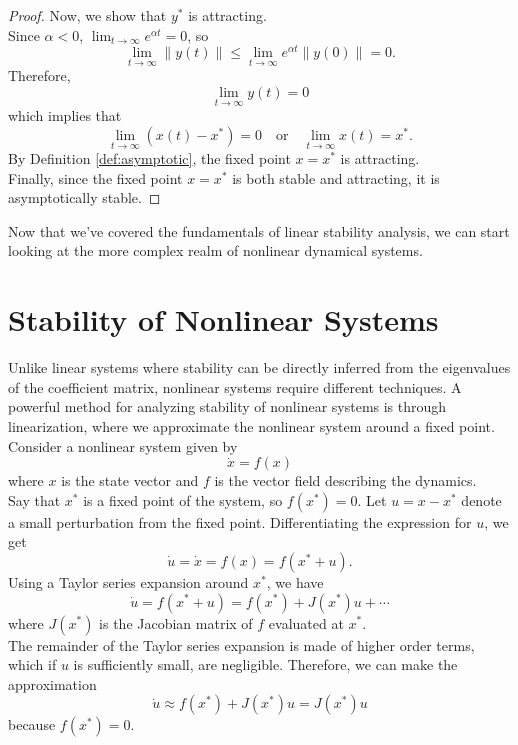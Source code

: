 \documentclass[12pt]{article}
\newcommand{\dx}{\dot{x}}
\newcommand{\du}{\dot{u}}
\begin{document}
\begin{proof}
Now, we show that $y^*$ is attracting. \\

Since $\alpha < 0$, $\lim_{t \to \infty} e^{\alpha t} = 0$, so
$$\lim_{t \to \infty} \|y(t)\| \le \lim_{t \to \infty} e^{\alpha t}\|y(0)\| = 0.$$
Therefore,
$$\lim_{t \to \infty} y(t) = 0$$
which implies that
$$\lim_{t \to \infty} (x(t) - x^*) = 0 \quad \text{or} \quad \lim_{t \to \infty} x(t) = x^*.$$
By Definition \ref{def:asymptotic}, the fixed point $x = x^*$ is attracting. \\

Finally, since the fixed point $x = x^*$ is both stable and attracting, it is asymptotically stable.
\end{proof}

Now that we've covered the fundamentals of linear stability analysis, we can start looking at the more complex realm of nonlinear dynamical systems.

\section{Stability of Nonlinear Systems}

Unlike linear systems where stability can be directly inferred from the eigenvalues of the coefficient matrix, nonlinear systems require different techniques. A powerful method for analyzing stability of nonlinear systems is through linearization, where we approximate the nonlinear system around a fixed point. \\

Consider a nonlinear system given by
$$\dx = f(x)$$
where $x$ is the state vector and $f$ is the vector field describing the dynamics. \\

Say that $x^*$ is a fixed point of the system, so $f(x^*) = 0$. Let $u = x - x^*$ denote a small perturbation from the fixed point. Differentiating the expression for $u$, we get
$$\du = \dx = f(x) = f(x^* + u).$$
Using a Taylor series expansion around $x^*$, we have
$$\du = f(x^* + u) = f(x^*) + J(x^*)u + \cdots$$
where $J(x^*)$ is the Jacobian matrix of $f$ evaluated at $x^*$. \\

The remainder of the Taylor series expansion is made of higher order terms, which if $u$ is sufficiently small, are negligible. Therefore, we can make the approximation
$$\du \approx f(x^*) + J(x^*)u = J(x^*)u$$
because $f(x^*) = 0$. \\
\end{document}
